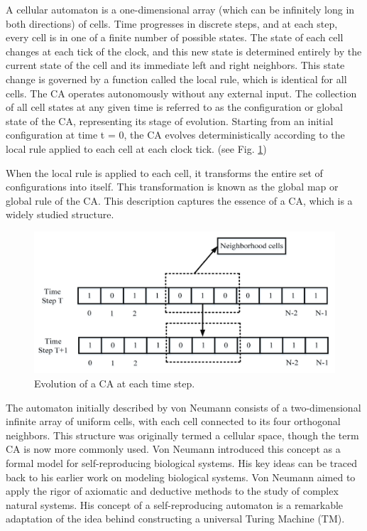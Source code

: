 \documentclass[9pt,a4paper,twoside]{tau-class/tau}
\begin{document}
    A cellular automaton  is a one-dimensional array (which can be infinitely long in both directions) of cells. 
    Time progresses in discrete steps, and at each step, every cell is in one of a finite number of possible states. The state of each cell changes at each tick of the clock, and this new state is determined entirely by the current state of the cell and its immediate left and right neighbors. 
    This state change is governed by a function called the local rule, which is identical for all cells. 
    The CA operates autonomously without any external input. 
    The collection of all cell states at any given time is referred to as the configuration or global state of the CA, 
    representing its stage of evolution. Starting from an initial configuration at time t = 0, the CA evolves deterministically according to the local 
    rule applied to each cell at each clock tick. (see Fig. \ref{fig:timeStep})

    When the local rule is applied to each cell, it transforms the entire set of configurations into itself. 
    This transformation is known as the global map or global rule of the CA. This description captures the essence of a CA, which is a widely studied structure.
    \begin{figure}[H]
        \centering
        \includegraphics[width=0.75\columnwidth]{figures/timestep.png}
        \caption{Evolution of a CA at each time step. \cite{math11102322}}
        \label{fig:timeStep}
    \end{figure}

    The automaton initially described by von Neumann\cite{von-neumann-automata} consists of a two-dimensional infinite array of uniform cells, with each cell connected to its four orthogonal neighbors. 
    This structure was originally termed a cellular space, though the term CA is now more commonly used. Von Neumann introduced this concept as a formal model for self-reproducing biological systems. His key ideas can be traced back to his earlier work on modeling biological systems. 
    Von Neumann aimed to apply the rigor of axiomatic and deductive methods to the study of complex natural systems. His concept of a self-reproducing automaton is a remarkable adaptation of the idea behind constructing a universal Turing Machine (TM).
\end{document}
